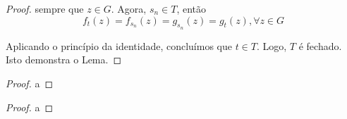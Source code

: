 \begin{proof}
sempre que $z \in G$. Agora, $s_n \in T$, então 
\begin{equation*}
f_t(z) = f_{s_n}(z) = g_{s_n}(z) = g_t(z), \forall z\in G
\end{equation*}

Aplicando o princípio da identidade, concluímos que $t \in T$. Logo, $T$ é fechado. 
Isto demonstra o Lema.
\end{proof}

\begin{definicao}
\label{def-continuacao-irrestrita}
\end{definicao}

\begin{exemplo}
\end{exemplo}

\begin{definicao}
\label{def-fep-homotopicas}
\end{definicao}

\begin{definicao}
\label{def-homotopica-a-zero}
\end{definicao}

\begin{definicao}
\label{def-simplesmente-conexo}
\end{definicao}

\begin{teorema}
\label{teo-monodromia}
\end{teorema}

\begin{proof}
a
\end{proof}

\begin{corolario}
\end{corolario}

\begin{proof}
a
\end{proof}
















